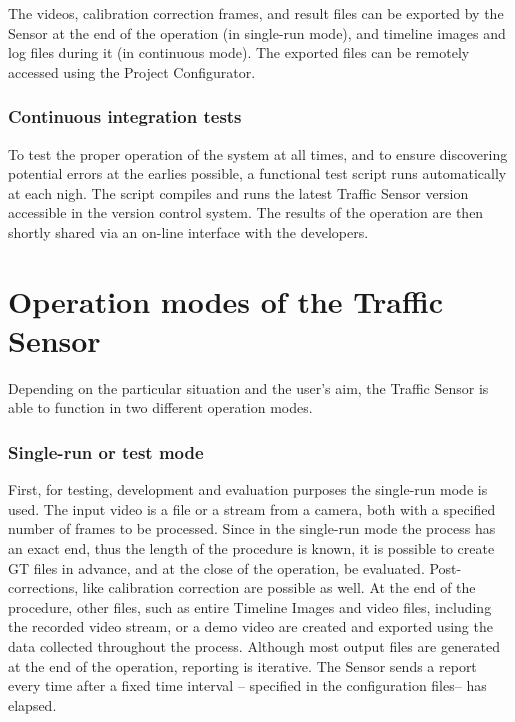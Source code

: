 The videos, calibration correction frames, and result files can be exported by the Sensor at the end of the operation (in single-run mode), and timeline images and log files during it (in continuous mode).
The exported files can be remotely accessed using the Project Configurator.

\subsubsection{Continuous integration tests}
To test the proper operation of the system at all times, and to ensure discovering potential errors at the earlies possible, a functional test script runs automatically at each nigh.
The script compiles and runs the latest Traffic Sensor version accessible in the version control system.
The results of the operation are then shortly shared via an on-line interface with the developers.
\section{Operation modes of the Traffic Sensor}\label{chap:operation_modes}
Depending on the particular situation and the user's aim, the Traffic Sensor is able to function in two different operation modes.
\subsubsection{Single-run or test mode}\label{sec:run_modes}
First, for testing, development and evaluation purposes the single-run mode is used.
The input video is a file or a stream from a camera, both with a specified number of frames to be processed.
Since in the single-run mode the process has an exact end, thus the length of the procedure is known, it is possible to create GT files in advance, and at the close of the operation, be evaluated.
Post-corrections, like calibration correction are possible as well.
At the end of the procedure, other files, such as entire Timeline Images and video files, including the recorded video stream, or a demo video are created and exported using the data collected throughout the process.
Although most output files are generated at the end of the operation, reporting is iterative.
The Sensor sends a report every time after a fixed time interval -- specified in the configuration files-- has elapsed.

